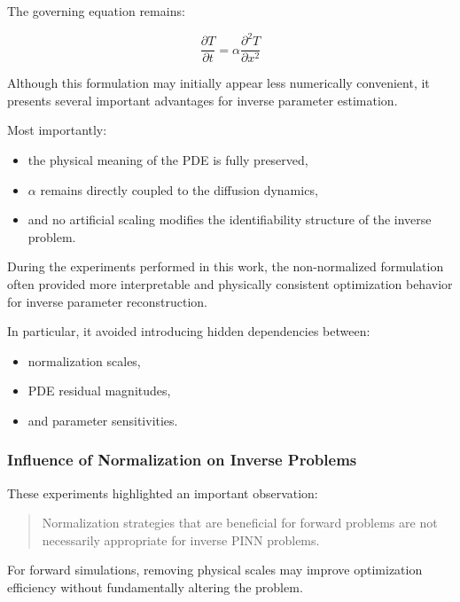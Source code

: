 The governing equation remains:

\begin{equation}
\frac{\partial T}{\partial t}
=
\alpha
\frac{\partial^2 T}{\partial x^2}
\end{equation}

Although this formulation may initially appear less numerically convenient, it presents several important advantages for inverse parameter estimation.

Most importantly:
\begin{itemize}
    \item the physical meaning of the PDE is fully preserved,
    \item $\alpha$ remains directly coupled to the diffusion dynamics,
    \item and no artificial scaling modifies the identifiability structure of the inverse problem.
\end{itemize}

During the experiments performed in this work, the non-normalized formulation often provided more interpretable and physically consistent optimization behavior for inverse parameter reconstruction.

In particular, it avoided introducing hidden dependencies between:
\begin{itemize}
    \item normalization scales,
    \item PDE residual magnitudes,
    \item and parameter sensitivities.
\end{itemize}

\subsubsection{Influence of Normalization on Inverse Problems}

These experiments highlighted an important observation:

\begin{quote}
Normalization strategies that are beneficial for forward problems are not necessarily appropriate for inverse PINN problems.
\end{quote}

For forward simulations, removing physical scales may improve optimization efficiency without fundamentally altering the problem.

